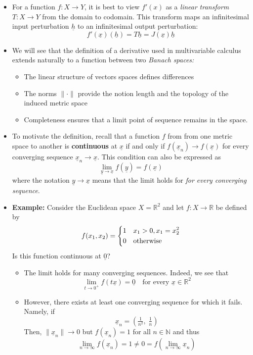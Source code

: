 \documentclass[11pt,twoside]{report}
\newcommand{\bbN}{{\mathbb{N}}}
\newcommand{\bbR}{{\mathbb{R}}}
\newcommand{\vecnot}{\underline}
\begin{document}
\begin{itemize}
\item For a function $f \colon X \to Y$, it is best to view $f'(x)$ as a \emph{linear transform} $T \colon X \to Y$ from the domain to codomain.
This transform maps an infinitesimal input perturbation $\vecnot{h}$ to an infinitesimal output perturbation:
\[
f'(\vecnot{x})(\vecnot{h}) = T \vecnot{h} = J(\vecnot{x}) \vecnot{h}
\]
 
 
 \item We will see that the definition of a derivative used in multivariable calculus  extends naturally to a function between two  \emph{Banach spaces:}
 \begin{itemize}
 \item The linear structure of vectors spaces defines differences
 \item The norms $\| \cdot\|$ provide the notion length and the topology of the induced metric space
 \item Completeness ensures that a limit point of sequence remains in the space.
 \end{itemize}
 
 
 \item To motivate the definition, recall that a function $f$ from from one metric space to another  is \textbf{continuous} at $\vecnot{x}$ if and only if $ f(\vecnot{x}_n) \to f(\vecnot{x})$ for every converging sequence  $\vecnot{x}_n \to \vecnot{x}$.  
This condition can also be expressed as 
\[
\lim_{\vecnot{y} \to \vecnot{x} }f( \vecnot{y} ) =  f(\vecnot{x}) 
\]
where the notation $\vecnot{y} \to \vecnot{x}$ means that the limit holds for \emph{for every converging sequence}. 
 
 
\item \textbf{Example:}  Consider the Euclidean space $X = \bbR^2$ and let $f \colon X \to \bbR$ be defined by 
\begin{align*}
f(x_1 , x_2) = \begin{dcases} 
1 & x_1 > 0, x_1 = x_2^2\\
0 & \text{otherwise}
\end{dcases}
\end{align*}
Is this function continuous at $\vecnot{0}$?
\begin{itemize}
\item The limit holds for many converging sequences. Indeed, we see that
\[
\lim_{t \to 0^+} f(t \vecnot{x} )  = \vecnot{0} \quad \text{for every $\vecnot{x} \in \bbR^2$}
\]
\item However, there exists at least one converging sequence for which it fails. Namely, if
\[
\vecnot{x}_n = \left ( \tfrac{1}{n^2}, \; \tfrac{1}{n} \right )%
\]
Then, $\|\vecnot{x}_n \| \to0$  but  $f(\vecnot{x}_n) = 1$ for all $n \in \bbN$ and thus
\[
\lim_{n \to \infty} f(\vecnot{x}_n)  = 1  \ne 0 = f( \lim_{n \to \infty} \vecnot{x}_n) %
\]
\end{itemize}


\end{itemize}
\end{document}
